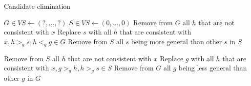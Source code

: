 \documentclass{report}
\begin{document}
\begin{algorithm}
\caption{Candidate elimination}
\label{alg:candidateelimation}
\begin{algorithmic}
\State $G\in VS \gets (?,...,?)$ 
\State $S\in VS \gets (0,...,0)$ 
\State Remove from $G$ all $h$ that are not consistent with $x$
\State Replace $s$ with all $h$ that are consistent with $x, h>_g s, h<_g g\in G$
\State Remove from $S$ all $s$ being more general than other $s$ in $S$
\EndFor
\EndIf

\State Remove from $S$ all $h$ that are not consistent with $x$
\State Replace $g$ with all $h$ that are consistent with $x, g>_g h, h>_g s\in S$
\State Remove from $G$ all $g$ being less general than other $g$ in $G$
\EndFor
\EndIf
\EndFor
\\
\end{algorithmic}
\end{algorithm}
\end{document}

